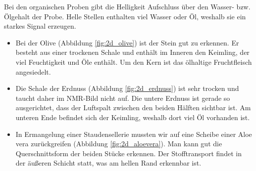 \documentclass[a4paper]{scrartcl} %
\begin{document}
Bei den organischen Proben gibt die Helligkeit Aufschluss über den Wasser- bzw. Ölgehalt der Probe. Helle Stellen enthalten viel Wasser oder Öl, weshalb sie ein starkes Signal erzeugen. 

\begin{itemize}
	\item Bei der Olive (Abbildung \ref{fig:2d_olive}) ist der Stein gut zu erkennen. Er besteht aus einer trockenen Schale und enthält im Inneren den Keimling, der viel Feuchtigkeit und Öle enthält. Um den Kern ist das ölhaltige Fruchtfleisch angesiedelt. 
	\item Die Schale der Erdnuss (Abbildung \ref{fig:2d_erdnuss}) ist sehr trocken und taucht daher im NMR-Bild nicht auf. Die untere Erdnuss ist gerade so ausgerichtet, dass der Luftspalt zwischen den beiden Hälften sichtbar ist. Am unteren Ende befindet sich der Keimling, weshalb dort viel Öl vorhanden ist.
	\item In Ermangelung einer Staudensellerie mussten wir auf eine Scheibe einer Aloe vera zurückgreifen (Abbildung \ref{fig:2d_aloevera}). Man kann gut die Querschnittsform der beiden Stücke erkennen. Der Stofftransport findet in der äußeren Schicht statt, was am hellen Rand erkennbar ist.
\end{itemize}
\end{document}
